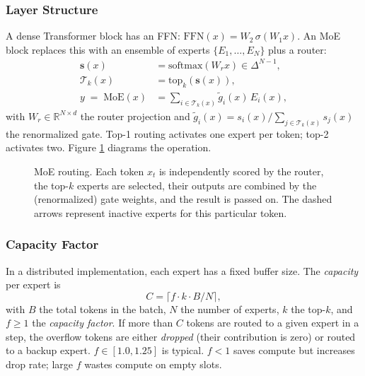 \subsubsection{Layer Structure}

A dense Transformer block has an FFN:
$\mathrm{FFN}(x) = W_2\,\sigma(W_1 x)$. An MoE block replaces this
with an ensemble of experts $\{E_1, \ldots, E_N\}$ plus a router:
\begin{align}
\label{eq:week6-moe-router}
\mathbf{s}(x)        &= \mathrm{softmax}(W_r x)\in \Delta^{N-1}, \\
\label{eq:week6-moe-topk}
\mathcal{T}_k(x)     &= \mathrm{top}_k(\mathbf{s}(x)), \\
\label{eq:week6-moe-out}
y \;=\; \mathrm{MoE}(x)
  &= \sum_{i \in \mathcal{T}_k(x)} \tilde g_i(x)\,E_i(x),
\end{align}
with $W_r \in \mathbb{R}^{N \times d}$ the router projection and
$\tilde g_i(x) = s_i(x) / \sum_{j \in \mathcal{T}_k(x)} s_j(x)$ the
renormalized gate. Top-1 routing
\citep{fedus2021switch} activates one expert per token; top-2
\citep{shazeer2017outrageously, lepikhin2021gshard,jiang2024mixtral}
activates two. Figure \ref{fig:week6-moe-routing} diagrams the
operation.

\begin{figure}[h]
\centering

\caption{MoE routing. Each token $x_t$ is independently scored by
  the router, the top-$k$ experts are selected, their outputs are
  combined by the (renormalized) gate weights, and the result is
  passed on. The dashed arrows represent inactive experts for this
  particular token.}
\label{fig:week6-moe-routing}
\end{figure}

\subsubsection{Capacity Factor}

In a distributed implementation, each expert has a fixed buffer size.
The \emph{capacity} per expert is
\begin{equation}
\label{eq:week6-capacity}
C = \lceil f \cdot k \cdot B / N \rceil,
\end{equation}
with $B$ the total tokens in the batch, $N$ the number of experts,
$k$ the top-$k$, and $f \ge 1$ the \emph{capacity factor}. If more
than $C$ tokens are routed to a given expert in a step, the overflow
tokens are either \emph{dropped} (their contribution is zero) or
routed to a backup expert. $f \in [1.0, 1.25]$ is typical. $f < 1$
saves compute but increases drop rate; large $f$ wastes compute on
empty slots.

